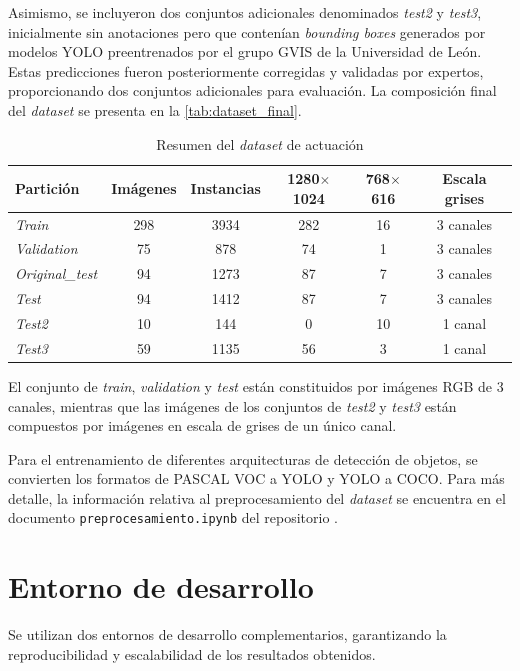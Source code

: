 \documentclass[12pt,a4paper,onecolumn,oneside]{report}
\begin{document}
Asimismo, se incluyeron dos conjuntos adicionales denominados \textit{test2} y \textit{test3}, inicialmente sin anotaciones pero que contenían \textit{bounding boxes} generados por modelos YOLO \cite{ultralytics_models} preentrenados 
por el grupo GVIS de la Universidad de León. Estas predicciones fueron posteriormente corregidas y validadas por expertos, proporcionando dos conjuntos adicionales para evaluación. 
La composición final del \textit{dataset} se presenta en la \autoref{tab:dataset_final}.

\clearpage
\begin{table}[htbp]
\caption{Resumen del \textit{dataset} de actuación}
\centering
{}
\begin{tabular}{l c c c c c}
\toprule
\textbf{Partición} & \textbf{Imágenes} & \textbf{Instancias} & \textbf{1280$\times$1024} & \textbf{768$\times$616} & \textbf{Escala grises}\\
\midrule
\textit{Train}          & 298 & 3934 & 282 & 16 & 3 canales\\
\textit{Validation}     &  75 &  878 & 74  & 1  & 3 canales\\
\textit{Original\_test} &  94 & 1273 & 87  & 7  & 3 canales\\
\textit{Test}           &  94 & 1412 & 87  & 7  & 3 canales\\
\textit{Test2}          &  10 &  144 & 0   & 10 & 1 canal\\
\textit{Test3}          &  59 & 1135 & 56  & 3  & 1 canal\\
\bottomrule
\end{tabular}
\label{tab:dataset_final}
\end{table}

El conjunto de \textit{train}, \textit{validation} y \textit{test} están constituidos por imágenes RGB de 3 canales, mientras que las imágenes 
de los conjuntos de \textit{test2} y \textit{test3} están compuestos por imágenes en escala de grises de un único canal. 

Para el entrenamiento de diferentes arquitecturas de detección de objetos, se convierten los formatos de PASCAL VOC a YOLO y YOLO a COCO. 
Para más detalle, la información relativa al preprocesamiento del \textit{dataset} se encuentra en el documento \texttt{preprocesamiento.ipynb} del repositorio \cite{repoTFM}.

\section{Entorno de desarrollo}
\label{sec:Entorno de desarrollo}
Se utilizan dos entornos de desarrollo complementarios, garantizando la reproducibilidad y escalabilidad de los resultados obtenidos.
\end{document}
